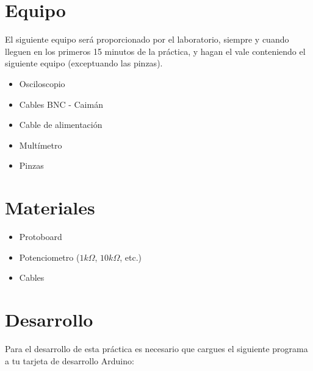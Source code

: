 

\section{Equipo}

	El siguiente equipo será proporcionado por el laboratorio, siempre y cuando lleguen en los primeros 15 minutos de la práctica, y hagan el vale conteniendo el siguiente equipo (exceptuando las pinzas).

	\begin{itemize}
		\item Osciloscopio
		\item Cables BNC - Caimán
		\item Cable de alimentación
		\item Multímetro
		\item Pinzas
	\end{itemize}


\section{Materiales}

	\begin{itemize}
		\item Protoboard
		\item Potenciometro ($1k\Omega$, $10k\Omega$, etc.)
		\item Cables
	\end{itemize}


\section{Desarrollo}

	Para el desarrollo de esta práctica es necesario que cargues el siguiente programa a tu tarjeta de desarrollo Arduino:

	

